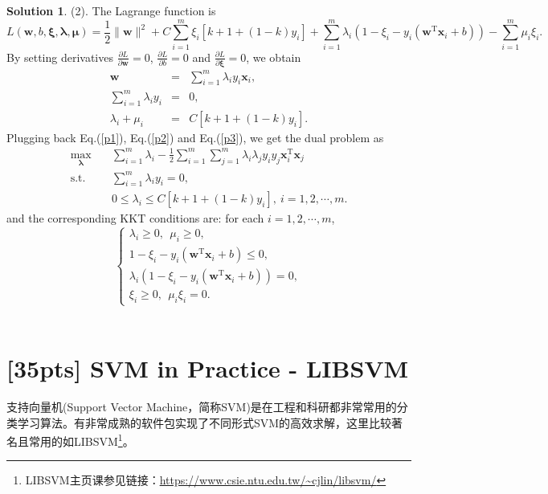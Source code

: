 \documentclass[a4paper,UTF8]{article}
\numberwithin{equation}{section}
\theoremstyle{definition}
\newtheorem*{solution}{Solution}
\begin{document}
\begin{solution}
\item[(2).] The Lagrange function is
\begin{equation}
L(\bm{w}, b, \bm{\xi}, \bm{\lambda}, \bm{\mu})=\frac{1}{2} \lVert \mathbf{w} \rVert^2 + C\sum_{i=1}^m\xi_i[k+1+(1-k)y_i]+\sum_{i=1}^{m}\lambda_i(1-\xi_i-y_i(\bm{w}^\mathrm{T}\bm{x}_i+b))-\sum_{i=1}^m\mu_i\xi_i.
\end{equation}
By setting derivatives $\frac{\partial L}{\partial \bm{w}}=0$, $\frac{\partial L}{\partial b}=0$ and $\frac{\partial L}{\partial \bm{\xi}}=0$, we obtain
\begin{eqnarray}
\bm{w}&=&\sum_{i=1}^m\lambda_iy_i\bm{x}_i, \label{p1}\\
\sum_{i=1}^m\lambda_iy_i&=&0, \label{p2}\\
\lambda_i+\mu_i&=&C[k+1+(1-k)y_i]. \label{p3}
\end{eqnarray}
Plugging back Eq.(\ref{p1}), Eq.(\ref{p2}) and Eq.(\ref{p3}), we get the dual problem as
\begin{equation}
\label{mod-svm}
\begin{split}
\max_{\bm{\lambda}}& \quad \sum_{i=1}^m\lambda_i-\frac{1}{2}\sum_{i=1}^m\sum_{j=1}^m\lambda_i\lambda_jy_iy_j\bm{x}_i^\mathrm{T}\bm{x}_j\\
\text{s.t.}&  \quad \sum_{i=1}^m\lambda_iy_i=0,\\
& \quad 0\leq\lambda_i\leq C[k+1+(1-k)y_i], \  i = 1,2,\cdots,m.
\end{split}
\end{equation}
and the corresponding KKT conditions are:  for each $i= 1,2,\cdots,m$,
\begin{equation}
\left\{
\begin{array}{l}
\lambda_i\geq 0,\ \ \mu_i\geq 0, \\
1-\xi_i-y_i(\bm{w}^\mathrm{T}\bm{x}_i+b)\leq 0, \\
\lambda_i(1-\xi_i-y_i(\bm{w}^\mathrm{T}\bm{x}_i+b))=0,\\
\xi_i\geq 0, \ \ \mu_i\xi_i=0.
\end{array}
\right.
\end{equation}
~\\
\end{solution}

\section{[35pts] SVM in Practice - LIBSVM} 
支持向量机(Support Vector Machine，简称SVM)是在工程和科研都非常常用的分类学习算法。有非常成熟的软件包实现了不同形式SVM的高效求解，这里比较著名且常用的如LIBSVM\footnote{LIBSVM主页课参见链接：\url{https://www.csie.ntu.edu.tw/~cjlin/libsvm/}}。
\end{document}
